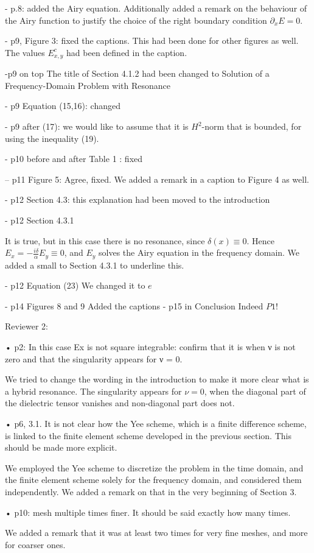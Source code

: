 \documentclass[a4paper,10pt]{article}
\begin{document}
 - p.8: added the Airy equation. Additionally added a remark on the behaviour of the Airy function to justify the choice of the right boundary 
 condition $\partial_x E=0$. 
 
 -  p9, Figure 3: fixed the captions. This had been done for other figures as well. The values $E^{c}_{x,y}$ had been defined in the caption.
 
 -p9 on top
  The title of Section 4.1.2 had been changed to Solution of a Frequency-Domain Problem with Resonance
  
 - p9 Equation (15,16): changed  

 - p9 after (17): we would like to assume that it is $H^2$-norm that is bounded, for using the inequality (19). 
  
 - p10 before and after Table 1 : fixed
 
 -- p11 Figure 5:
Agree, fixed. We added a remark in a caption to Figure 4 as well.



- p12 Section 4.3: this explanation had been moved to the introduction



- p12 Section 4.3.1

  It is true, but in this case there is no resonance, since $\delta(x)\equiv 0$. Hence $E_x=-\frac{i\delta}{\alpha}E_y\equiv 0$, 
  and $E_y$ solves the Airy equation in the frequency domain. We added a small to Section 4.3.1 to underline this. 

  
- p12 Equation (23)
We changed it to $e$
  
- p14 Figures 8 and 9
Added the captions  
- p15 in Conclusion
  Indeed $P1$!
  

 Reviewer 2:
 
 • p2: In this case Ex is not square integrable: confirm that it is when ν is not zero and that
the singularity appears for ν = 0.

We tried to change the wording in the introduction to make it more clear what is a hybrid resonance. 
The singularity appears for $\nu=0$, when the diagonal part of the dielectric tensor vanishes and non-diagonal part does not. 

• p6, 3.1. It is not clear how the Yee scheme, which is a finite difference scheme, is linked to the
finite element scheme developed in the previous section. This should be made more explicit.

We employed the Yee scheme to discretize the problem in the time domain, and the finite element scheme solely for the frequency domain, 
and considered them independently. We added a remark on that in the very beginning of Section 3. 

• p10: mesh multiple times finer. It should be said exactly how many times. 

We added a remark that it was at least two times for very fine meshes, and more for coarser ones.


  
 
\end{document}
